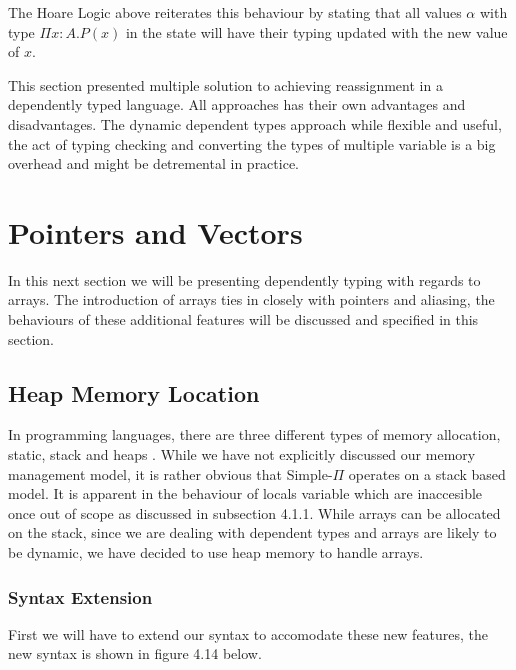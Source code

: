 \documentclass[a4paper,12pt]{report}
\begin{document}
\par
The Hoare Logic above reiterates this behaviour by stating that all values $\alpha$ with 
type $\Pi x : A.P(x)$ in the state will have their typing updated with the new value 
of $x$.

This section presented multiple solution to achieving reassignment in a 
dependently typed language. All approaches has their own advantages and 
disadvantages. The dynamic dependent types approach while flexible and useful, 
the act of typing checking and converting the types of multiple variable is a 
big overhead and might be detremental in practice. 

\section{Pointers and Vectors}
In this next section we will be presenting dependently typing with regards to 
arrays. The introduction of arrays ties in closely with pointers and aliasing, 
the behaviours of these additional features will be discussed and specified in this 
section.

\subsection{Heap Memory Location}
In programming languages, there are three different types of memory allocation, 
static, stack and heaps \cite{heapVsStack}. While we have not explicitly 
discussed our memory management model, it is rather obvious that Simple-$\Pi$ 
operates on a stack based model. It is apparent in the behaviour of locals 
variable which are inaccesible once out of scope as discussed in subsection 
4.1.1. While arrays can be allocated on the stack, since we are dealing 
with dependent types and arrays are likely to be dynamic, we have decided to use heap 
memory to handle arrays. 

\subsubsection{Syntax Extension}
First we will have to extend our syntax to accomodate these new features, the 
new syntax is shown in figure 4.14 below.
\end{document}
